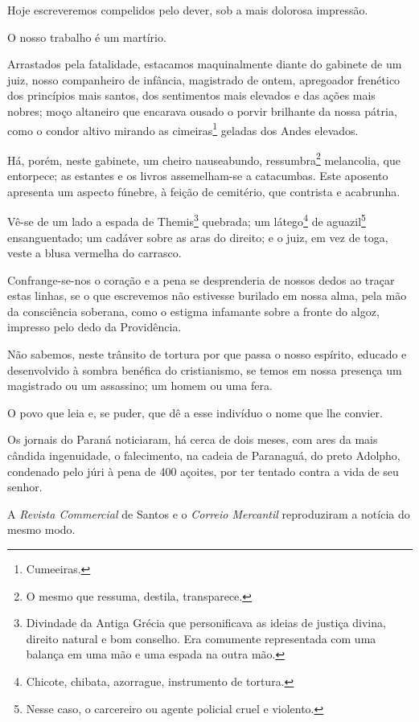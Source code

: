 Hoje escreveremos compelidos pelo dever, sob a mais dolorosa impressão.

O nosso trabalho é um martírio.

Arrastados pela fatalidade, estacamos maquinalmente diante do gabinete
de um juiz, nosso companheiro de infância, magistrado de ontem,
apregoador frenético dos princípios mais santos, dos sentimentos mais
elevados e das ações mais nobres; moço altaneiro que encarava ousado o
porvir brilhante da nossa pátria, como o condor altivo mirando as
cimeiras\footnote{Cumeeiras.} geladas dos Andes elevados.

Há, porém, neste gabinete, um cheiro nauseabundo, ressumbra\footnote{O
  mesmo que ressuma, destila, transparece.} melancolia, que entorpece;
as estantes e os livros assemelham-se a catacumbas. Este aposento
apresenta um aspecto fúnebre, à feição de cemitério, que contrista e
acabrunha.

Vê-se de um lado a espada de Themis\footnote{Divindade da Antiga
  Grécia que personificava as ideias de justiça divina, direito natural
  e bom conselho. Era comumente representada com uma balança em uma mão
  e uma espada na outra mão.} quebrada; um látego\footnote{Chicote,
  chibata, azorrague, instrumento de tortura.} de aguazil\footnote{
  Nesse caso, o carcereiro ou agente policial cruel e violento.}
ensanguentado; um cadáver sobre as aras do direito; e o juiz, em vez de
toga, veste a blusa vermelha do carrasco.

Confrange-se-nos o coração e a pena se desprenderia de nossos dedos ao
traçar estas linhas, se o que escrevemos não estivesse burilado em nossa
alma, pela mão da consciência soberana, como o estigma infamante sobre a
fronte do algoz, impresso pelo dedo da Providência.

Não sabemos, neste trânsito de tortura por que passa o nosso espírito,
educado e desenvolvido à sombra benéfica do cristianismo, se temos em
nossa presença um magistrado ou um assassino; um homem ou uma fera.

O povo que leia e, se puder, que dê a esse indivíduo o nome que lhe
convier.

Os jornais do Paraná noticiaram, há cerca de dois meses, com ares da
mais cândida ingenuidade, o falecimento, na cadeia de Paranaguá, do
preto Adolpho, condenado pelo júri à pena de 400 açoites, por ter
tentado contra a vida de seu senhor.

A \emph{Revista Commercial} de Santos e o \emph{Correio Mercantil}
reproduziram a notícia do mesmo modo.


